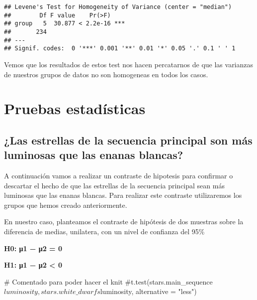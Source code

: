 \documentclass[
]{article}
\newenvironment{Shaded}{\begin{snugshade}}{\end{snugshade}}
\newcommand{\AttributeTok}[1]{\textcolor[rgb]{0.80,0.80,0.80}{#1}}
\newcommand{\CommentTok}[1]{\textcolor[rgb]{0.50,0.62,0.50}{#1}}
\newcommand{\FunctionTok}[1]{\textcolor[rgb]{0.94,0.94,0.56}{#1}}
\newcommand{\NormalTok}[1]{\textcolor[rgb]{0.80,0.80,0.80}{#1}}
\newcommand{\SpecialCharTok}[1]{\textcolor[rgb]{0.86,0.64,0.64}{#1}}
\newcommand{\StringTok}[1]{\textcolor[rgb]{0.80,0.58,0.58}{#1}}
\begin{document}
\begin{Shaded}
\end{Shaded}

\begin{verbatim}
## Levene's Test for Homogeneity of Variance (center = "median")
##        Df F value    Pr(>F)    
## group   5  30.877 < 2.2e-16 ***
##       234                      
## ---
## Signif. codes:  0 '***' 0.001 '**' 0.01 '*' 0.05 '.' 0.1 ' ' 1
\end{verbatim}

Vemos que los resultados de estos test nos hacen percatarnos de que las
varianzas de nuestros grupos de datos no son homogeneas en todos los
casos.

\hypertarget{pruebas-estaduxedsticas}{%
\section{Pruebas estadísticas}\label{pruebas-estaduxedsticas}}

\hypertarget{las-estrellas-de-la-secuencia-principal-son-muxe1s-luminosas-que-las-enanas-blancas}{%
\subsection{¿Las estrellas de la secuencia principal son más luminosas
que las enanas
blancas?}\label{las-estrellas-de-la-secuencia-principal-son-muxe1s-luminosas-que-las-enanas-blancas}}

A continuación vamos a realizar un contraste de hipotesis para confirmar
o descartar el hecho de que las estrellas de la secuencia principal sean
más luminosas que las enanas blancas. Para realizar este contraste
utilizaremos los grupos que hemos creado anteriormente.

En nuestro caso, planteamos el contraste de hipótesis de dos muestras
sobre la diferencia de medias, unilatera, con un nivel de confianza del
95\%

\textbf{H0: μ1 − μ2 = 0}

\textbf{H1: μ1 − μ2 \textless{} 0}

\begin{Shaded}
\begin{Highlighting}[]
\CommentTok{\# Comentado para poder hacer el knit}
\CommentTok{\#t.test(stars.main\_sequence$luminosity, stars.white\_dwarfs$luminosity, alternative = "less")}
\end{Highlighting}
\end{Shaded}
\end{document}
